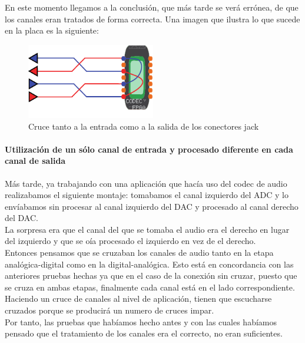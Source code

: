 En este momento llegamos a la conclusión, que más tarde se verá errónea, de que los canales eran tratados de forma correcta. Una imagen que ilustra lo que sucede en la placa es la siguiente:
\begin{figure}[h]
\begin{center}
	\includegraphics[width=0.5\textwidth]{./swapping_channels-eps-converted-to}
\caption{Cruce tanto a la entrada como a la salida de los conectores jack}
\end{center}
\end{figure}

		\paragraph{Utilización de un sólo canal de entrada y procesado diferente en cada canal de salida}
	
			Más tarde, ya trabajando con una aplicación que hacía uso del codec de audio realizabamos el siguiente montaje: tomabamos el canal izquierdo del ADC y lo envíabamos sin procesar al canal izquierdo del DAC y procesado al canal derecho del DAC.\\

La sorpresa era que el canal del que se tomaba el audio era el derecho en lugar del izquierdo y que se oía procesado el izquierdo en vez de el derecho.\\

Entonces pensamos que se cruzaban los canales de audio tanto en la etapa analógica-digital como en la digital-analógica. Esto está en concordancia con las anteriores pruebas hechas ya que en el caso de la conexión sin cruzar, puesto que se cruza en ambas etapas, finalmente cada canal está en el lado correspondiente.\\

Haciendo un cruce de canales al nivel de aplicación, tienen que escucharse cruzados porque se producirá un numero de cruces impar.\\

Por tanto, las pruebas que habíamos hecho antes y con las cuales habíamos pensado que el tratamiento de los canales era el correcto, no eran suficientes.\\

